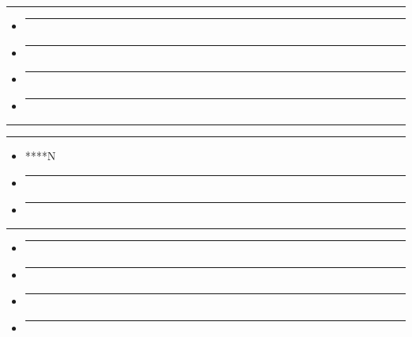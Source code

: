 \begin{center}\rule{0.5\linewidth}{0.5pt}\end{center}

\begin{itemize}
\item
  \begin{center}\rule{0.5\linewidth}{0.5pt}\end{center}
\item
  \begin{center}\rule{0.5\linewidth}{0.5pt}\end{center}
\item
  \begin{center}\rule{0.5\linewidth}{0.5pt}\end{center}
\item
  \begin{center}\rule{0.5\linewidth}{0.5pt}\end{center}
\end{itemize}

\begin{center}\rule{0.5\linewidth}{0.5pt}\end{center}

\begin{center}\rule{0.5\linewidth}{0.5pt}\end{center}

\begin{itemize}
\item
  ****N
\item
  \begin{center}\rule{0.5\linewidth}{0.5pt}\end{center}
\item
  \begin{center}\rule{0.5\linewidth}{0.5pt}\end{center}
\end{itemize}

\begin{center}\rule{0.5\linewidth}{0.5pt}\end{center}

\begin{itemize}
\item
  \begin{center}\rule{0.5\linewidth}{0.5pt}\end{center}
\item
  \begin{center}\rule{0.5\linewidth}{0.5pt}\end{center}
\item
  \begin{center}\rule{0.5\linewidth}{0.5pt}\end{center}
\item
  \begin{center}\rule{0.5\linewidth}{0.5pt}\end{center}
\end{itemize}

